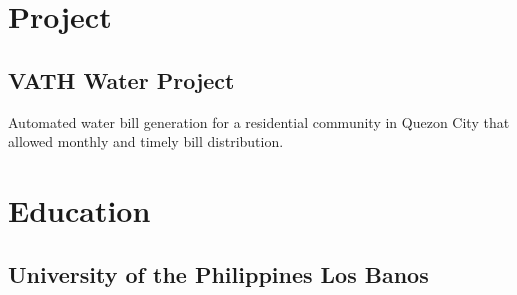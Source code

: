 \documentclass[top=0in]{deedy-resume-openfont}
\begin{document}
\begin{minipage}[t]{0.66\textwidth}

\section{Project}

\subsection{VATH Water Project}
Automated water bill generation for a residential community in Quezon City that allowed monthly and timely bill distribution.


\section{Education}

\subsection{University of the Philippines Los Banos}
\sectionsep




\end{minipage}
\end{document}
